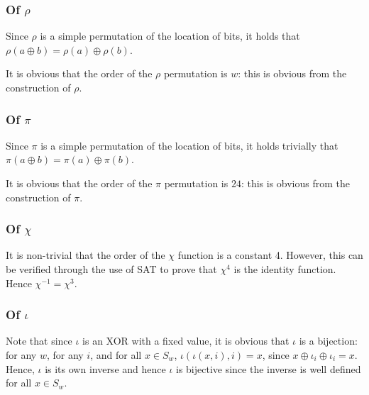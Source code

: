 \documentclass[10pt,twocolumn,twoside]{pnas-new}
\begin{document}
\subsubsection{Of $\rho$} \label{sec:p:r}


Since $\rho$ is a simple permutation of the location of bits, it holds that
$\rho(a \oplus b) = \rho(a) \oplus \rho(b)$.

It is obvious that the order of the $\rho$ permutation is $w$: this is obvious
from the construction of $\rho$.

\subsubsection{Of $\pi$} \label{sec:p:p}


Since $\pi$ is a simple permutation of the location of bits, it holds trivially
that $\pi(a \oplus b) = \pi(a) \oplus \pi(b)$.

It is obvious that the order of the $\pi$ permutation is $24$: this is obvious
from the construction of $\pi$.

\subsubsection{Of $\chi$} \label{sec:p:c}


It is non-trivial that the order of the $\chi$ function is a constant 4.
However, this can be verified through the use of SAT to prove that $\chi^{4}$
is the identity function. Hence $\chi^{-1} = \chi^{3}$.

\subsubsection{Of $\iota$} \label{sec:p:i}


Note that since $\iota$ is an XOR with a fixed value, it is obvious that
$\iota$ is a bijection: for any $w$, for any $i$, and for all $x \in S_{w}$,
$\iota(\iota(x, i), i) = x$, since $x \oplus \iota_{i} \oplus \iota_{i} = x$.
Hence, $\iota$ is its own inverse and hence $\iota$ is bijective since the
inverse is well defined for all $x \in S_{w}$.
\end{document}
